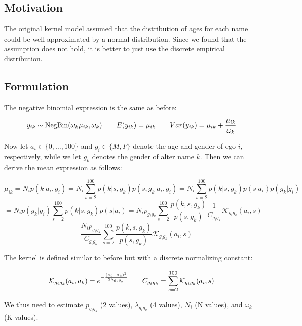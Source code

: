 \documentclass[12pt]{article}
\begin{document}

\def\ci{\perp\!\!\!\perp}
\def\ex{\mathbb{E}}
\def\prob{\mathbb{P}}
\def\ind{\mathbb{I}}
\def\grad{\triangledown}
\def\bigo{\mathcal{O}}

\subsection*{Motivation}
The original kernel model assumed that the distribution of ages for each name could be well approximated by a normal distribution. Since we found that the assumption does not hold, it is better to just use the discrete empirical distribution.

\subsection*{Formulation}
The negative binomial expression is the same as before:

$$ y_{ik} \sim \text{NegBin}(\omega_k \mu_{ik}, \omega_k)
\hspace{20 pt} E(y_{ik}) = \mu_{ik} 
\hspace{20 pt} Var(y_{ik}) = \mu_{ik} + \frac{\mu_{ik}}{\omega_k}$$

\noindent  Now let $a_i \in \{0,\dots,100\}$ and $g_i \in \{M,F\}$ denote the age and gender of ego $i$, respectively, while we let $g_k$ denotes the gender of alter name $k$. Then we can derive the mean expression as follows:

$$ \mu_{ik} = N_i p(k|a_i,g_i)
= N_i \sum_{s=2}^{100} p(k|s,g_k) p(s,g_k|a_i,g_i) 
= N_i \sum_{s=2}^{100} p(k|s,g_k) p(s|a_i) p(g_k|g_i)$$
$$ = N_i  p(g_k|g_i) \sum_{s=2}^{100} p(k|s,g_k) p(s|a_i)
= N_i p_{g_ig_k}  \sum_{s=2}^{100} \frac{p(k,s,g_k)}{p(s,g_k)} \frac{1}{C_{g_ig_k}} \mathcal{K}_{g_ig_k}(a_i,s)$$
$$ = \frac{N_i p_{g_ig_k}}{C_{g_ig_k}} \sum_{s=2}^{100} \frac{p(k,s,g_k)}{p(s,g_k)} \mathcal{K}_{g_ig_k}(a_i,s)$$

\noindent The kernel is defined similar to before but with a discrete normalizing constant:

$$ \mathcal{K}_{g_ig_k}(a_i, a_k) = e^{-\frac{(a_i-a_k)^2}{2\lambda_{g_ig_k}}} 
\hspace{20 pt}
C_{g_ig_k} = \sum_{s=2}^{100}  \mathcal{K}_{g_ig_k}(a_i, s) $$

\vspace{15 pt} \noindent We thus need to estimate $p_{g_ig_k}$ (2 values), $\lambda_{g_ig_k}$ (4 values), $N_i$ (N values), and $\omega_k$ (K values).
\end{document}
